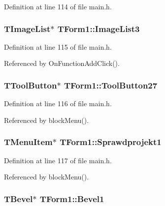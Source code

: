 Definition at line 114 of file main.h.\hypertarget{classTForm1_7d80296d375fe1604de82f41c6317466}{
\subsubsection[ImageList3]{\setlength{\rightskip}{0pt plus 5cm}TImageList$\ast$ {\bf TForm1::ImageList3}}}
\label{classTForm1_7d80296d375fe1604de82f41c6317466}




Definition at line 115 of file main.h.

Referenced by OnFunctionAddClick().\hypertarget{classTForm1_f25d192dc2f51425796a90e4aa58c987}{
\subsubsection[ToolButton27]{\setlength{\rightskip}{0pt plus 5cm}TToolButton$\ast$ {\bf TForm1::ToolButton27}}}
\label{classTForm1_f25d192dc2f51425796a90e4aa58c987}




Definition at line 116 of file main.h.

Referenced by blockMenu().\hypertarget{classTForm1_70c28fd142eba444dc791df0eafc8385}{
\subsubsection[Sprawdprojekt1]{\setlength{\rightskip}{0pt plus 5cm}TMenuItem$\ast$ {\bf TForm1::Sprawdprojekt1}}}
\label{classTForm1_70c28fd142eba444dc791df0eafc8385}




Definition at line 117 of file main.h.

Referenced by blockMenu().\hypertarget{classTForm1_fe711fe83a9246f1d158850214061ca4}{
\subsubsection[Bevel1]{\setlength{\rightskip}{0pt plus 5cm}TBevel$\ast$ {\bf TForm1::Bevel1}}}
\label{classTForm1_fe711fe83a9246f1d158850214061ca4}




